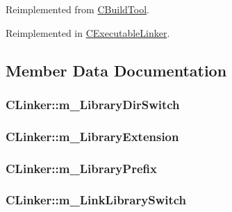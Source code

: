 Reimplemented from \hyperlink{classCBuildTool_af0331a777785bc2d15236b5c74321ed2}{C\-Build\-Tool}.



Reimplemented in \hyperlink{classCExecutableLinker_a6124deba72724510423c17963f960578}{C\-Executable\-Linker}.



\subsection{Member Data Documentation}
\hypertarget{classCLinker_a8221d44b37262b0c8c6bfbf7d0f1680e}{
\subsubsection[{m\-\_\-\-Library\-Dir\-Switch}]{ C\-Linker\-::m\-\_\-\-Library\-Dir\-Switch\hspace{0.3cm}{\ttfamily [protected]}}}\label{classCLinker_a8221d44b37262b0c8c6bfbf7d0f1680e}
\hypertarget{classCLinker_af481e3e79703844fe6b7b9bc0a44d8b2}{
\subsubsection[{m\-\_\-\-Library\-Extension}]{ C\-Linker\-::m\-\_\-\-Library\-Extension\hspace{0.3cm}{\ttfamily [protected]}}}\label{classCLinker_af481e3e79703844fe6b7b9bc0a44d8b2}
\hypertarget{classCLinker_a701e77df0c24ca36679b98328ba509e6}{
\subsubsection[{m\-\_\-\-Library\-Prefix}]{ C\-Linker\-::m\-\_\-\-Library\-Prefix\hspace{0.3cm}{\ttfamily [protected]}}}\label{classCLinker_a701e77df0c24ca36679b98328ba509e6}
\hypertarget{classCLinker_a2417ec61775026fc3efcfb46118c5a93}{
\subsubsection[{m\-\_\-\-Link\-Library\-Switch}]{ C\-Linker\-::m\-\_\-\-Link\-Library\-Switch\hspace{0.3cm}{\ttfamily [protected]}}}\label{classCLinker_a2417ec61775026fc3efcfb46118c5a93}
